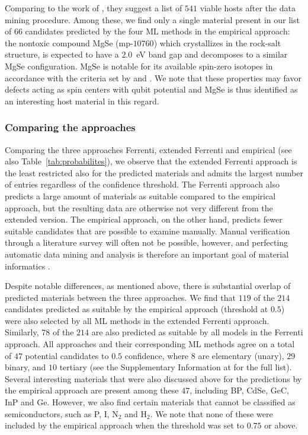 \documentclass[superscriptaddress,unsortedaddress,
 amsmath,amssymb,
 aps,
]{revtex4-2}
\begin{document}
Comparing to the work of \citeauthor{Ferrenti2020} \cite{Ferrenti2020}, they suggest a list of $541$ viable hosts after the data mining procedure.  
Among these, we find only a single material present in our list of $66$ candidates predicted by the four ML methods in the empirical approach: the nontoxic compound MgSe (mp-$10760$) which crystallizes in the rock-salt structure, is expected to have a $2.0$~eV band gap and decomposes to a similar MgSe configuration. 
MgSe is notable for its available spin-zero isotopes in accordance with the criteria set by \citeauthor{Weber2010} \cite{Weber2010} and \citeauthor{Ferrenti2020} \cite{Ferrenti2020}. We note that these properties may favor defects acting as spin centers with qubit potential and MgSe is thus identified as an interesting host material in this regard.   

\subsubsection*{Comparing the approaches}
Comparing the three approaches Ferrenti, extended Ferrenti and empirical (see also Table~\ref{tab:probabilites}), we observe that the extended Ferrenti approach is the least restricted also for the predicted materials and admits the largest number of entries regardless of the confidence threshold. 
The Ferrenti approach also predicts a large amount of materials as suitable compared to the empirical approach, but the resulting data are otherwise not very different from the extended version. The empirical approach, on the other hand, predicts fewer suitable candidates that are possible to examine  manually. 
Manual verification through a literature survey will often not be possible, however, and perfecting automatic data mining and analysis is therefore an important goal of material informatics \cite{rickman2019}. 

Despite notable differences, as mentioned above, there is substantial overlap of predicted materials between the three approaches. 
We find that $119$ of the $214$ candidates predicted as suitable by the empirical approach (threshold at $0.5$) were also selected by all ML methods in the extended Ferrenti approach. 
Similarly, $78$ of the $214$ are also predicted as suitable by all models in the Ferrenti approach. All approaches and their corresponding ML methods agree on a total of $47$ potential candidates to $0.5$ confidence, where $8$ are elementary (unary), $29$ binary, and $10$ tertiary  
(see the Supplementary Information at \cite{supplementary} for the full list). 
Several interesting materials that were also discussed above for the predictions by the empirical approach are present among these $47$, including BP, CdSe, GeC, InP and Ge. However, we also find certain materials that cannot be classified as semiconductors, such as P, I, N$_2$ and H$_2$. We note that none of these were included by the empirical approach when the threshold was set to $0.75$ or above. 
\end{document}
